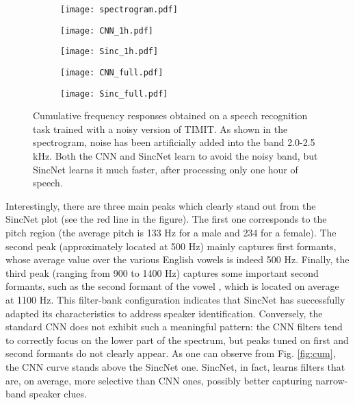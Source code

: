 \documentclass{article}
\begin{document}
\begin{itemize}
\begin{figure*}[t!]

\begin{subfigure}{0.5\textwidth}
\texttt{[image: spectrogram.pdf]}
\label{fig:cnn_filt}
\end{subfigure} 

\begin{subfigure}{0.5\textwidth}
\texttt{[image: CNN\_1h.pdf]}
\label{fig:cnn_filt}
\end{subfigure} \hspace{0.0\textwidth}
\begin{subfigure}{0.50\textwidth}
\texttt{[image: Sinc\_1h.pdf]}
\label{fig:sinc_filt}
\end{subfigure}

\begin{subfigure}{0.5\textwidth}
\texttt{[image: CNN\_full.pdf]}
\label{fig:cnn_filt}
\end{subfigure} \hspace{0.0\textwidth}
\begin{subfigure}{0.50\textwidth}
\texttt{[image: Sinc\_full.pdf]}
\label{fig:sinc_filt}
\end{subfigure}


\caption{Cumulative frequency responses obtained on a speech recognition task trained with a noisy version of TIMIT. As shown in the spectrogram, noise has been artificially added into the band 2.0-2.5 kHz. Both the CNN and SincNet learn to avoid the noisy band, but SincNet learns it much faster, after processing only one hour of speech.}
\label{fig:asr_cum}
\end{figure*}

Interestingly, there are three main peaks which clearly stand out from the SincNet plot (see the red line in the figure). The first one corresponds to the pitch region (the average pitch is 133 Hz for a male and 234 for a female). The second peak (approximately located at 500 Hz) mainly captures first formants, whose average value over the various English vowels is indeed 500 Hz. Finally, the third peak (ranging from 900 to 1400 Hz) captures some important second formants, such as the second formant of the vowel , which is located on average at 1100 Hz.
This filter-bank configuration indicates that SincNet has successfully adapted its characteristics to address speaker identification. Conversely, the standard CNN does not exhibit such a meaningful pattern: the CNN filters tend to correctly focus on the lower part of the spectrum, but peaks tuned on first and second formants do not clearly appear. As one can observe from Fig. \ref{fig:cum}, the CNN curve stands above the SincNet one. SincNet, in fact, learns filters that are, on average, more selective than CNN ones, possibly better capturing narrow-band speaker clues.


\end{itemize}
\end{document}
